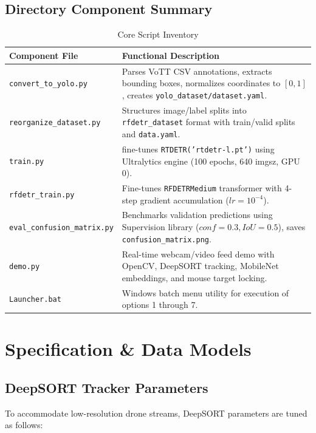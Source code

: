 \documentclass[11pt,a4paper]{article}
\begin{document}
\subsection{Directory Component Summary}
\begin{table}[H]
    \centering
    \begin{tabularx}{\textwidth}{@{}lX@{}}
        \toprule
        \textbf{Component File} & \textbf{Functional Description} \\
        \midrule
        \texttt{convert\_to\_yolo.py} & Parses VoTT CSV annotations, extracts bounding boxes, normalizes coordinates to $[0, 1]$, creates \texttt{yolo\_dataset/dataset.yaml}. \\
        \texttt{reorganize\_dataset.py} & Structures image/label splits into \texttt{rfdetr\_dataset} format with train/valid splits and \texttt{data.yaml}. \\
        \texttt{train.py} & fine-tunes \texttt{RTDETR('rtdetr-l.pt')} using Ultralytics engine (100 epochs, 640 imgsz, GPU 0). \\
        \texttt{rfdetr\_train.py} & Fine-tunes \texttt{RFDETRMedium} transformer with 4-step gradient accumulation ($lr = 10^{-4}$). \\
        \texttt{eval\_confusion\_matrix.py} & Benchmarks validation predictions using Supervision library ($conf=0.3, IoU=0.5$), saves \texttt{confusion\_matrix.png}. \\
        \texttt{demo.py} & Real-time webcam/video feed demo with OpenCV, DeepSORT tracking, MobileNet embeddings, and mouse target locking. \\
        \texttt{Launcher.bat} & Windows batch menu utility for execution of options 1 through 7. \\
        \bottomrule
    \end{tabularx}
    \caption{Core Script Inventory}
\end{table}

\newpage

\section{Specification \& Data Models}



\subsection{DeepSORT Tracker Parameters}
To accommodate low-resolution drone streams, DeepSORT parameters are tuned as follows:
\end{document}
